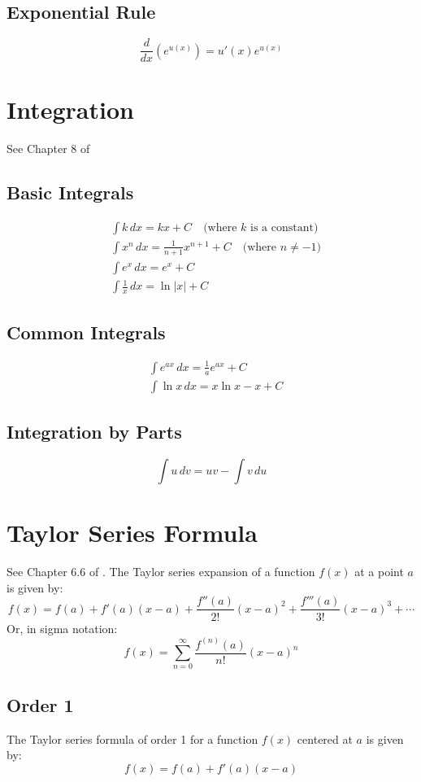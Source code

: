 \documentclass[11pt,a4paper]{book}
\theoremstyle{definition}\newtheorem{definition}{Definition}
\theoremstyle{definition}\newtheorem{fact}{Fact}
\theoremstyle{definition}\newtheorem{remark}{Remark}
\theoremstyle{definition}\newtheorem{ex}{Ex.}
\theoremstyle{definition}\newtheorem{project}{Project}
\theoremstyle{definition}\newtheorem{problem}{Problem}
\theoremstyle{definition}\newtheorem{example}{Example}
\numberwithin{theorem}{section}
\numberwithin{corollary}{chapter}
\numberwithin{assumption}{chapter}
\numberwithin{definition}{chapter}
\numberwithin{prop}{chapter}
\numberwithin{notation}{chapter}
\numberwithin{problem}{chapter}
\numberwithin{example}{chapter}
\numberwithin{fact}{chapter}
\numberwithin{ex}{chapter}
\begin{document}
\begin{appendices}
	\subsection*{Exponential Rule}
	\[
	\frac{d}{dx} (e^{u(x)}) = u'(x) e^{u(x)}
	\]
	
	\section{Integration}
	See Chapter 8 of \citet{springcamp}
	\subsection*{Basic Integrals}
	\begin{align*}
		&\int k \, dx = kx + C \quad \text{(where $k$ is a constant)} \\
		&\int x^n \, dx = \frac{1}{n+1} x^{n+1} + C \quad \text{(where $n \neq -1$)} \\
		&\int e^x \, dx = e^x + C \\
		&\int \frac{1}{x} \, dx = \ln |x| + C
	\end{align*}
	
	\subsection*{Common Integrals}
	\begin{align*}
		&\int e^{ax} \, dx = \frac{1}{a} e^{ax} + C \\
		&\int \ln x \, dx = x \ln x - x + C
	\end{align*}
	
	\subsection*{Integration by Parts}
	\[
	\int u \, dv = uv - \int v \, du
	\]
	
	\section{Taylor Series Formula}
	See Chapter 6.6 of \citet{springcamp}. The Taylor series expansion of a function $f(x)$ at a point $a$ is given by:
	\[
	f(x) = f(a) + f'(a)(x - a) + \frac{f''(a)}{2!}(x - a)^2 + \frac{f'''(a)}{3!}(x - a)^3 + \dotsb
	\]
	Or, in sigma notation:
	\[
	f(x) = \sum_{n=0}^{\infty} \frac{f^{(n)}(a)}{n!}(x - a)^n
	\]
	\subsection*{Order 1}
	The Taylor series formula of order 1 for a function $f(x)$ centered at $a$ is given by:
	\[
	f(x) = f(a) + f'(a)(x - a)
	\]
	

\end{appendices}
\end{document}
